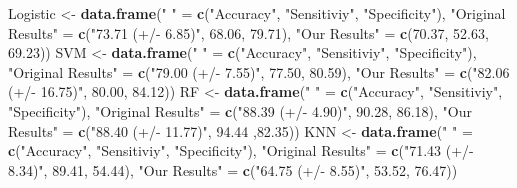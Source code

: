 \documentclass[
]{article}
\newenvironment{Shaded}{\begin{snugshade}}{\end{snugshade}}
\newcommand{\FloatTok}[1]{\textcolor[rgb]{0.00,0.00,0.81}{#1}}
\newcommand{\FunctionTok}[1]{\textcolor[rgb]{0.13,0.29,0.53}{\textbf{#1}}}
\newcommand{\NormalTok}[1]{#1}
\newcommand{\OtherTok}[1]{\textcolor[rgb]{0.56,0.35,0.01}{#1}}
\newcommand{\StringTok}[1]{\textcolor[rgb]{0.31,0.60,0.02}{#1}}
\begin{document}
\begin{Shaded}
\begin{Highlighting}[]
\NormalTok{Logistic }\OtherTok{\textless{}{-}} \FunctionTok{data.frame}\NormalTok{(}\StringTok{" "} \OtherTok{=} \FunctionTok{c}\NormalTok{(}\StringTok{"Accuracy"}\NormalTok{, }\StringTok{"Sensitiviy"}\NormalTok{, }\StringTok{"Specificity"}\NormalTok{), }\StringTok{"Original Results"} \OtherTok{=} \FunctionTok{c}\NormalTok{(}\StringTok{"73.71 (+/{-} 6.85)"}\NormalTok{, }\FloatTok{68.06}\NormalTok{, }\FloatTok{79.71}\NormalTok{), }\StringTok{"Our Results"} \OtherTok{=} \FunctionTok{c}\NormalTok{(}\FloatTok{70.37}\NormalTok{, }\FloatTok{52.63}\NormalTok{, }\FloatTok{69.23}\NormalTok{))}
\NormalTok{SVM }\OtherTok{\textless{}{-}} \FunctionTok{data.frame}\NormalTok{(}\StringTok{" "} \OtherTok{=} \FunctionTok{c}\NormalTok{(}\StringTok{"Accuracy"}\NormalTok{, }\StringTok{"Sensitiviy"}\NormalTok{, }\StringTok{"Specificity"}\NormalTok{), }\StringTok{"Original Results"} \OtherTok{=} \FunctionTok{c}\NormalTok{(}\StringTok{"79.00 (+/{-} 7.55)"}\NormalTok{, }\FloatTok{77.50}\NormalTok{, }\FloatTok{80.59}\NormalTok{), }\StringTok{"Our Results"} \OtherTok{=} \FunctionTok{c}\NormalTok{(}\StringTok{"82.06 (+/{-} 16.75)"}\NormalTok{, }\FloatTok{80.00}\NormalTok{, }\FloatTok{84.12}\NormalTok{))}
\NormalTok{RF }\OtherTok{\textless{}{-}} \FunctionTok{data.frame}\NormalTok{(}\StringTok{" "} \OtherTok{=} \FunctionTok{c}\NormalTok{(}\StringTok{"Accuracy"}\NormalTok{, }\StringTok{"Sensitiviy"}\NormalTok{, }\StringTok{"Specificity"}\NormalTok{), }\StringTok{"Original Results"} \OtherTok{=} \FunctionTok{c}\NormalTok{(}\StringTok{"88.39 (+/{-} 4.90)"}\NormalTok{, }\FloatTok{90.28}\NormalTok{, }\FloatTok{86.18}\NormalTok{), }\StringTok{"Our Results"} \OtherTok{=} \FunctionTok{c}\NormalTok{(}\StringTok{"88.40 (+/{-} 11.77)"}\NormalTok{, }\FloatTok{94.44}\NormalTok{ ,}\FloatTok{82.35}\NormalTok{))}
\NormalTok{KNN }\OtherTok{\textless{}{-}} \FunctionTok{data.frame}\NormalTok{(}\StringTok{" "} \OtherTok{=} \FunctionTok{c}\NormalTok{(}\StringTok{"Accuracy"}\NormalTok{, }\StringTok{"Sensitiviy"}\NormalTok{, }\StringTok{"Specificity"}\NormalTok{), }\StringTok{"Original Results"} \OtherTok{=} \FunctionTok{c}\NormalTok{(}\StringTok{"71.43 (+/{-} 8.34)"}\NormalTok{, }\FloatTok{89.41}\NormalTok{, }\FloatTok{54.44}\NormalTok{), }\StringTok{"Our Results"} \OtherTok{=} \FunctionTok{c}\NormalTok{(}\StringTok{"64.75 (+/{-} 8.55)"}\NormalTok{, }\FloatTok{53.52}\NormalTok{, }\FloatTok{76.47}\NormalTok{))}


\end{Highlighting}
\end{Shaded}
\end{document}
